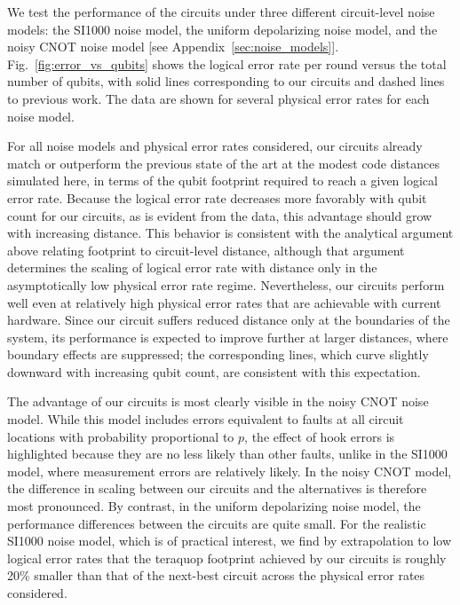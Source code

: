 \documentclass[twocolumn,
aps,
prx,
showpacs,
amsmath,
amssymb,
floatfix,
longbibliography,
superscriptaddress,
eprint]
{revtex4-1}
\begin{document}
We test the performance of the circuits under three different circuit-level noise models: the SI1000 noise model, the uniform depolarizing noise model, and the noisy CNOT noise model [see Appendix~\ref{sec:noise_models}].
Fig.~\ref{fig:error_vs_qubits} shows the logical error rate per round versus the total number of qubits, with solid lines corresponding to our circuits and dashed lines to previous work.
The data are shown for several physical error rates for each noise model.

For all noise models and physical error rates considered, our circuits already match or outperform the previous state of the art at the modest code distances simulated here, in terms of the qubit footprint required to reach a given logical error rate.
Because the logical error rate decreases more favorably with qubit count for our circuits, as is evident from the data, this advantage should grow with increasing distance.
This behavior is consistent with the analytical argument above relating footprint to circuit-level distance, although that argument determines the scaling of logical error rate with distance only in the asymptotically low physical error rate regime.
Nevertheless, our circuits perform well even at relatively high physical error rates that are achievable with current hardware.
Since our circuit suffers reduced distance only at the boundaries of the system, its performance is expected to improve further at larger distances, where boundary effects are suppressed; the corresponding lines, which curve slightly downward with increasing qubit count, are consistent with this expectation.

The advantage of our circuits is most clearly visible in the noisy CNOT noise model.
While this model includes errors equivalent to faults at all circuit locations with probability proportional to $p$, the effect of hook errors is highlighted because they are no less likely than other faults, unlike in the SI1000 model, where measurement errors are relatively likely.
In the noisy CNOT model, the difference in scaling between our circuits and the alternatives is therefore most pronounced.
By contrast, in the uniform depolarizing noise model, the performance differences between the circuits are quite small.
For the realistic SI1000 noise model, which is of practical interest, we find by extrapolation to low logical error rates that the teraquop footprint achieved by our circuits is roughly 20\% smaller than that of the next-best circuit across the physical error rates considered.
\end{document}

